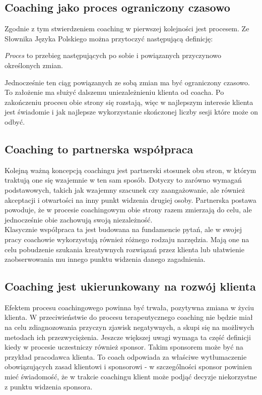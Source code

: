 \subsection{Coaching jako proces ograniczony czasowo}
Zgodnie z tym stwierdzeniem coaching w pierwszej kolejności jest procesem. Ze Słownika Języka Polskiego można przytoczyć następującą definicję:
\begin{defn}
\emph{Proces} to przebieg następujących po sobie i powiązanych przyczynowo określonych zmian.
\end{defn}
Jednocześnie ten ciąg powiązanych ze sobą zmian ma być ograniczony czasowo. To założenie ma służyć dalszemu uniezależnieniu klienta
od coacha. Po zakończeniu procesu obie strony się rozstają, więc w najlepszym interesie klienta jest świadomie i jak najlepsze wykorzystanie
skończonej liczby sesji które może on odbyć.

\subsection{Coaching to partnerska współpraca}
Kolejną ważną koncepcją coachingu jest partnerski stosunek obu stron, w którym traktują one się wzajemnie w ten sam sposób. Dotyczy to zarówno
wymagań podstawowych, takich jak wzajemny szacunek czy zaangażowanie, ale również akceptacji i otwartości na inny punkt widzenia drugiej
osoby. Partnerska postawa powoduje, że w procesie coachingowym obie strony razem zmierzają do celu, ale jednocześnie obie zachowują
swoją niezależność. \\

Klasycznie współpraca ta jest budowana na fundamencie pytań, ale w swojej pracy coachowie wykorzystują również różnego rodzaju
narzędzia. Mają one na celu pobudzenie szukania kreatywnych rozwiązań przez klienta lub ułatwienie zaobserwowania
mu innego punktu widzenia danego zagadnienia.

\subsection{Coaching jest ukierunkowany na rozwój klienta}
Efektem procesu coachingowego powinna być trwała, pozytywna zmiana w życiu klienta. W przeciwieństwie do procesu terapeutycznego coaching
nie będzie miał na celu zdiagnozowania przyczyn zjawisk negatywnych, a skupi się na możliwych metodach ich przezwyciężenia. Jeszcze większej
uwagi wymaga ta część definicji kiedy w procesie uczestniczy również sponsor. Takim sponsorem może być na przykład pracodawca klienta.
To coach odpowiada za właściwe wytłumaczenie obowiązujących zasad klientowi i sponsorowi - w szczególności sponsor powinien mieć świadomość,
że w trakcie coachingu klient może podjąć decyzje niekorzystne z punktu widzenia sponsora.

